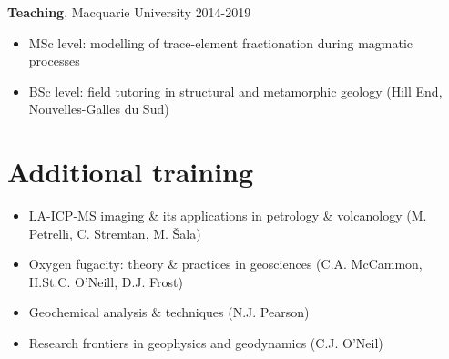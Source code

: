 \documentclass[a4paper,11pt]{article}
\begin{document}
\textbf{Teaching}, Macquarie University
\hfill {2014-2019}
    \begin{itemize}[label={},itemsep=0pt,parsep=0pt]
        \item MSc level: modelling of trace-element fractionation during magmatic processes 
        \item BSc level: field tutoring in structural and metamorphic geology (Hill End, Nouvelles-Galles du Sud)
    \end{itemize}

\section{Additional training}

    \begin{itemize}[label={},itemsep=0pt,parsep=0pt]
        \item LA-ICP-MS imaging \& its applications in petrology \& volcanology (M. Petrelli, C. Stremtan, M. Šala)
        \item Oxygen fugacity: theory \& practices in geosciences (C.A. McCammon, H.St.C. O’Neill, D.J. Frost)
        \item Geochemical analysis \& techniques (N.J. Pearson)
        \item Research frontiers in geophysics and geodynamics (C.J. O’Neil)
    \end{itemize}
    
%    
%

\end{document}
